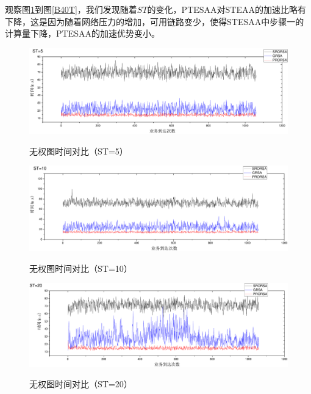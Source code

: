 观察图\ref{B5T}到图\ref{B40T}，我们发现随着$ST$的变化，PTESAA对STEAA的加速比略有下降，这是因为随着网络压力的增加，可用链路变少，使得STESAA中步骤一的计算量下降，PTESAA的加速优势变小。
\begin{figure}
\setlength{\belowcaptionskip}{-0.5cm}
\begin{center}
{\includegraphics[width=1 \textwidth]{figures/B5T.pdf}}
\end{center}
\caption{{\footnotesize{无权图时间对比（ST=5）}}}
\label{B5T}
\end{figure}
\begin{figure}
\setlength{\belowcaptionskip}{-0.5cm}
\begin{center}
{\includegraphics[width=1 \textwidth]{figures/B10T.pdf}}
\end{center}
\caption{{\footnotesize{无权图时间对比（ST=10）}}}
\label{B10T}
\end{figure}
\begin{figure}
\setlength{\belowcaptionskip}{-0.5cm}
\begin{center}
{\includegraphics[width=1 \textwidth]{figures/B20T.pdf}}
\end{center}
\caption{{\footnotesize{无权图时间对比（ST=20）}}}
\label{B20T}
\end{figure}
